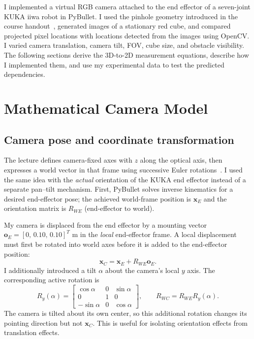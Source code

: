 \documentclass[11pt,letterpaper]{article}
\begin{document}
I implemented a virtual RGB camera attached to the end effector of a seven-joint KUKA iiwa robot in PyBullet. I used the pinhole geometry introduced in the course handout~\cite{ferrari}, generated images of a stationary red cube, and compared projected pixel locations with locations detected from the images using OpenCV. I varied camera translation, camera tilt, FOV, cube size, and obstacle visibility. The following sections derive the 3D-to-2D measurement equations, describe how I implemented them, and use my experimental data to test the predicted dependencies.

\section{Mathematical Camera Model}
\subsection{Camera pose and coordinate transformation}
The lecture defines camera-fixed axes with $z$ along the optical axis, then expresses a world vector in that frame using successive Euler rotations~\cite[Eq.~(2)]{ferrari}. I used the same idea with the \emph{actual} orientation of the KUKA end effector instead of a separate pan--tilt mechanism. First, PyBullet solves inverse kinematics for a desired end-effector pose; the achieved world-frame position is $\mathbf{x}_E$ and the orientation matrix is $R_{WE}$ (end-effector to world).

My camera is displaced from the end effector by a mounting vector $\mathbf{o}_E=[0,\,0.10,\,0.10]^T$ m in the \emph{local} end-effector frame. A local displacement must first be rotated into world axes before it is added to the end-effector position:
\begin{equation}
\boxed{\mathbf{x}_C=\mathbf{x}_E+R_{WE}\mathbf{o}_E.}\label{eq:campos}
\end{equation}
I additionally introduced a tilt $\alpha$ about the camera's local $y$ axis. The corresponding active rotation is
\begin{equation}
R_y(\alpha)=\begin{bmatrix}\cos\alpha&0&\sin\alpha\\0&1&0\\-\sin\alpha&0&\cos\alpha\end{bmatrix},\qquad
\boxed{R_{WC}=R_{WE}R_y(\alpha).}\label{eq:camrot}
\end{equation}
The camera is tilted about its own center, so this additional rotation changes its pointing direction but not $\mathbf{x}_C$. This is useful for isolating orientation effects from translation effects.
\end{document}
